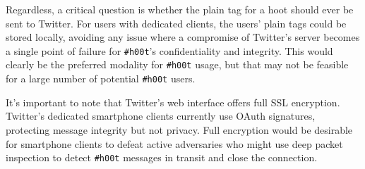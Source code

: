 \documentclass{sig-alternate-arxiv}
\newcommand{\hoot}{{\tt \#h00t}\xspace}
\newcommand{\msg}{hoot\xspace}
\begin{document}
Regardless, a critical question is whether the plain tag for a \msg should ever be sent to Twitter. For users with dedicated clients, the users' plain tags could be stored locally, avoiding any issue where a compromise of Twitter's server becomes a single point of failure for \hoot's confidentiality and integrity. This would clearly be the preferred modality for \hoot usage, but that may not be feasible for a large number of potential \hoot users.

It's important to note that Twitter's web interface offers full SSL encryption. Twitter's dedicated smartphone clients currently use OAuth signatures, protecting message integrity but not privacy. Full encryption would be desirable for smartphone clients to defeat active adversaries who might use deep packet inspection to detect \hoot messages in transit and close the connection.
\end{document}
